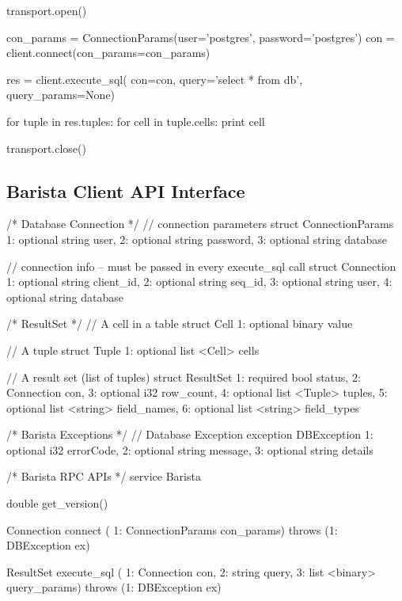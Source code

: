\documentclass[a4paper]{article}
\begin{document}
\begin{multicols}{2}
{{\begin{spverbatim}
transport.open()

con_params = ConnectionParams(user='postgres', password='postgres')
con = client.connect(con_params=con_params)

res  = client.execute_sql(
  con=con,
  query='select * from db',
  query_params=None)

for tuple in res.tuples:
  for cell in tuple.cells:
    print cell

transport.close()
\end{spverbatim}
}
}
\subsection{Barista Client API Interface}
\tiny{
\begin{spverbatim}
/* Database Connection */
// connection parameters
struct ConnectionParams {
  1: optional string user,
  2: optional string password,
  3: optional string database
}

// connection info -- must be passed in every execute_sql call
struct Connection {
  1: optional string client_id,
  2: optional string seq_id,
  3: optional string user,
  4: optional string database
}


/* ResultSet */
// A cell in a table
struct Cell {
  1: optional binary value
}

// A tuple
struct Tuple {
  1: optional list <Cell> cells
}

// A result set (list of tuples)
struct ResultSet {
  1: required bool status,
  2: Connection con,
  3: optional i32 row_count,
  4: optional list <Tuple> tuples,
  5: optional list <string> field_names,
  6: optional list <string> field_types
}


/* Barista Exceptions */
// Database Exception
exception DBException {
  1: optional i32 errorCode,
  2: optional string message,
  3: optional string details
}


/* Barista RPC APIs */
service Barista {
  double get_version()

  Connection connect (
     1: ConnectionParams con_params) throws (1: DBException ex)

  ResultSet execute_sql (
     1: Connection con,
     2: string query,
     3: list <binary> query_params) throws (1: DBException ex)
}
\end{spverbatim}
}
\end{multicols}
\end{document}
